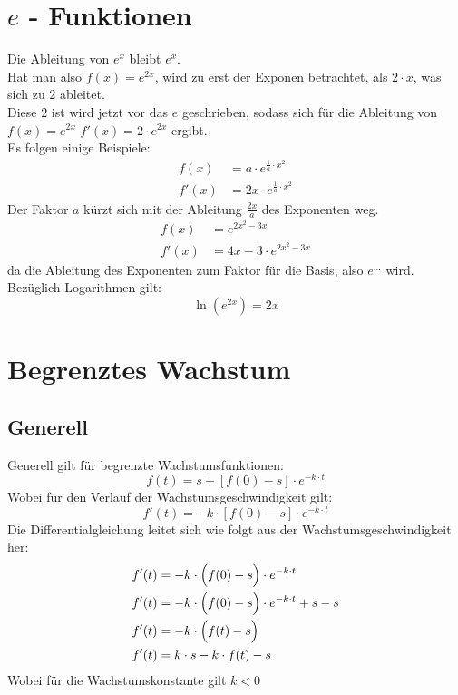 \documentclass[a4paper,12pt]{article}
\begin{document}
\section{$e$ - Funktionen}
Die Ableitung von $e^x$ bleibt $e^x$.\\
Hat man also $f(x) = e^{2x}$, wird zu erst der Exponen betrachtet, als $2 \cdot x$, was sich zu $2$ ableitet.\\
Diese $2$ ist wird jetzt vor das $e$ geschrieben, sodass sich für die Ableitung von $f(x) = e^{2x}$ $f'(x) = 2 \cdot e^{2x}$ ergibt.\\
Es folgen einige Beispiele:\\
\begin{equation*}
\begin{split}
f(x) & = a \cdot e^{\frac{1}{a} \cdot x^2}\\
f'(x) & = 2x \cdot e^{\frac{1}{a} \cdot x^2}
\end{split}
\end{equation*}
Der Faktor $a$ kürzt sich mit der Ableitung $\frac{2x}{a}$ des Exponenten weg.
\begin{equation*}
\begin{split}
f(x) & = e^{2x^2-3x}\\
f'(x) & = 4x - 3 \cdot e^{2x^2-3x}
\end{split}
\end{equation*}
da die Ableitung des Exponenten zum Faktor für die Basis, also $e^{...}$ wird.\\
Bezüglich Logarithmen gilt:$$\ln{(e^{2x})} = 2x$$
\pagebreak
\section{Begrenztes Wachstum}
\subsection{Generell}
Generell gilt für begrenzte Wachstumsfunktionen:
$$f(t) = s + [f(0) - s] \cdot e^{-k \cdot t}$$
Wobei für den Verlauf der Wachstumsgeschwindigkeit gilt:
$$f'(t) = -k \cdot [f(0) - s] \cdot e^{-k \cdot t}$$
Die Differentialgleichung leitet sich wie folgt aus der Wachstumsgeschwindigkeit her:
\begin{equation*}
\begin{split}
f'(t) & = -k \cdot \Big{(}f(0) - s\Big{)} \cdot e^{-k \cdot t}\\
f'(t) & = -k \cdot \Big{(}f(0) - s\Big{)} \cdot e^{-k \cdot t} + s - s\\
f'(t) & = -k \cdot \Big{(}f(t) - s\Big{)}\\
f'(t) & = k \cdot s - k \cdot f(t) - s\\
\end{split}
\end{equation*}
Wobei für die Wachstumskonstante gilt $k < 0$
\end{document}
